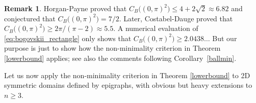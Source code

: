 \documentclass[11pt]{article}
\theoremstyle{plain}
\theoremstyle{definition}
\newtheorem{remark}[theorem]{Remark}
\numberwithin{equation}{section}
\begin{document}
\begin{remark}
Horgan-Payne \cite[(6.37)]{horgan} proved that $C_B\big((0,\pi)^2\big)\le4+2\sqrt2 \approx 6.82$ and conjectured \cite[(6.39)]{horgan} that
$C_B\big((0,\pi)^2\big)=7/2$.
Later, Costabel-Dauge \cite[(7.3)]{costabel} proved that $C_B\big((0,\pi)^2\big)\ge2\pi/(\pi-2)\approx5.5$. A numerical evaluation of
\eqref{eq:bogovskii_rectangle} only shows that $C_B\big((0,\pi)^2\big)\ge 2.0438\ldots$ But our purpose is just to show how the
non-minimality criterion in Theorem \ref{lowerbound} applies; see also the comments following Corollary~\ref{ballmin}.
\end{remark}

Let us now apply the non-minimality criterion in Theorem \ref{lowerbound} to 2D symmetric domains defined by epigraphs, with obvious
but heavy extensions to $n\ge3$.
\end{document}
